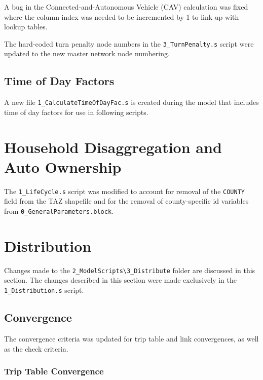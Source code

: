 \documentclass[
  letterpaper,
  DIV=11,
  numbers=noendperiod]{scrreprt}
\begin{document}
A bug in the Connected-and-Autonomous Vehicle (CAV) calculation was
fixed where the column index was needed to be incremented by 1 to link
up with lookup tables.

The hard-coded turn penalty node numbers in the
\texttt{3\_TurnPenalty.s} script were updated to the new master network
node numbering.

\hypertarget{time-of-day-factors}{%
\section{Time of Day Factors}\label{time-of-day-factors}}

A new file \texttt{1\_CalculateTimeOfDayFac.s} is created during the
model that includes time of day factors for use in following scripts.


\hypertarget{household-disaggregation-and-auto-ownership-1}{%
\chapter{Household Disaggregation and Auto
Ownership}\label{household-disaggregation-and-auto-ownership-1}}

The \texttt{1\_LifeCycle.s} script was modified to account for removal
of the \texttt{COUNTY} field from the TAZ shapefile and for the removal
of county-specific id variables from
\texttt{0\_GeneralParameters.block}.


\hypertarget{distribution}{%
\chapter{Distribution}\label{distribution}}

Changes made to the
\texttt{2\_ModelScripts\textbackslash{}3\_Distribute} folder are
discussed in this section. The changes described in this section were
made exclusively in the \texttt{1\_Distribution.s} script.

\hypertarget{convergence}{%
\section{Convergence}\label{convergence}}

The convergence criteria was updated for trip table and link
convergences, as well as the check criteria.

\hypertarget{trip-table-convergence}{%
\subsection{Trip Table Convergence}\label{trip-table-convergence}}
\end{document}
